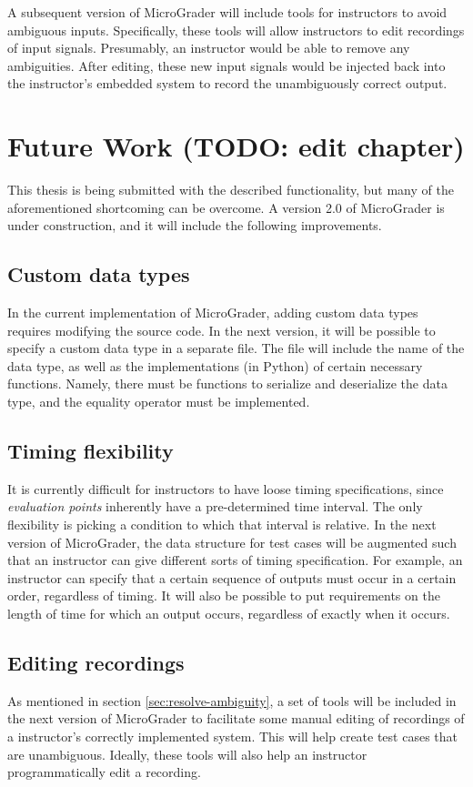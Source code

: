 \documentclass[12pt]{article}
\begin{document}
A subsequent version of MicroGrader will include tools for instructors to avoid ambiguous inputs.  Specifically, these tools will allow instructors to edit recordings of input signals.  Presumably, an instructor would be able to remove any ambiguities.  After editing, these new input signals would be injected back into the instructor's embedded system to record the unambiguously correct output.


\newpage
\section{Future Work (TODO: edit chapter)}
This thesis is being submitted with the described functionality, but many of the aforementioned shortcoming can be overcome.  A version 2.0 of MicroGrader is under construction, and it will include the following improvements.

\subsection{Custom data types}
In the current implementation of MicroGrader, adding custom data types requires modifying the source code.  In the next version, it will be possible to specify a custom data type in a separate file.  The file will include the name of the data type, as well as the implementations (in Python) of certain necessary functions.  Namely, there must be functions to serialize and deserialize the data type, and the equality operator must be implemented.

\subsection{Timing flexibility}
It is currently difficult for instructors to have loose timing specifications, since \textit{evaluation points} inherently have a pre-determined time interval.  The only flexibility is picking a condition to which that interval is relative.  In the next version of MicroGrader, the data structure for test cases will be augmented such that an instructor can give different sorts of timing specification.  For example, an instructor can specify that a certain sequence of outputs must occur in a certain order, regardless of timing.  It will also be possible to put requirements on the length of time for which an output occurs, regardless of exactly when it occurs.

\subsection{Editing recordings}
As mentioned in section \ref{sec:resolve-ambiguity}, a set of tools will be included in the next version of MicroGrader to facilitate some manual editing of recordings of a instructor's correctly implemented system.  This will help create test cases that are unambiguous.  Ideally, these tools will also help an instructor programmatically edit a recording.
\end{document}
